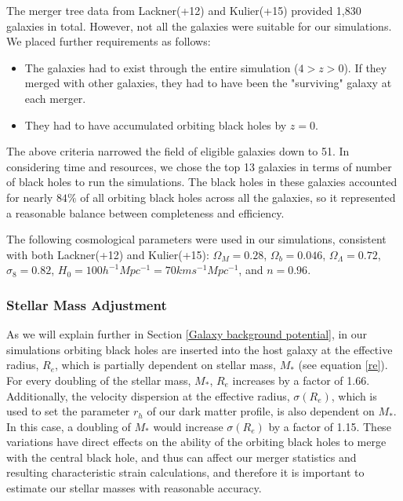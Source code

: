 \documentclass[english, backref,breaklinks,colorlinks,citecolor=blue, usenatbib]{mnras}
\begin{document}
The merger tree data from Lackner(+12) and Kulier\-(+15) provided 1,830 galaxies in total.  However, not all the galaxies were suitable for our simulations.  We placed further requirements as follows:
\begin{itemize}
\item The galaxies had to exist through the entire simulation ($4 > z > 0$).  If they merged with other galaxies, they had to have been the "surviving" galaxy at each merger.
\item They had to have accumulated orbiting black holes by $z = 0$.
\end{itemize}

The above criteria narrowed the field of eligible galaxies down to 51.  In considering time and resources, we chose the top 13 galaxies in terms of number of black holes to run the simulations.  The black holes in these galaxies accounted for nearly $84{\%}$ of all orbiting black holes across all the galaxies, so it represented a reasonable balance between completeness and efficiency.

The following cosmological parameters were used in our simulations, consistent with both Lackner(+12) and Kulier(+15):   $\Omega_M = 0.28$, $\Omega_b = 0.046$, $\Omega_\Lambda = 0.72$, $\sigma_8 = 0.82$, $H_0 = 100h^{-1}Mpc^{-1} = 70 km s^{-1} Mpc^{-1}$, and $n = 0.96$.

\subsubsection{Stellar Mass Adjustment}
As we will explain further in Section \ref{Galaxy background potential}, in our simulations orbiting black holes are inserted into the host galaxy at the effective radius, $R_e$, which is partially dependent on stellar mass, $M_*$ (see equation \ref{re}).  For every doubling of the stellar mass, $M_*$, $R_e$ increases by a factor of 1.66.  Additionally, the velocity dispersion at the effective radius, $\sigma(R_e)$, which is used to set the parameter $r_h$ of our dark matter profile, is also dependent on $M_*$.  In this case, a doubling of $M_*$ would increase $\sigma(R_e)$ by a factor of 1.15.  These variations have direct effects on the ability of the orbiting black holes to merge with the central black hole, and thus can affect our merger statistics and resulting characteristic strain calculations, and therefore it is important to estimate our stellar masses with reasonable accuracy.
\end{document}
